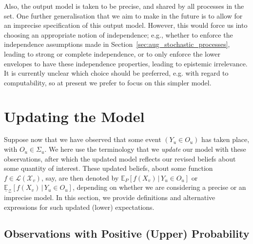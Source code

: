 \documentclass[twoside,11pt]{article}
\newcommand{\states}{\mathcal{X}}
\newcommand{\gambles}{\mathcal{L}}
\begin{document}
Also, the output model is taken to be precise, and shared by all processes in the set. One further generalisation that we aim to make in the future is to allow for an imprecise specification of this output model. However, this would force us into choosing an appropriate notion of independence; e.g., whether to enforce the independence assumptions made in Section~\ref{sec:aug_stochastic_processes}, leading to strong or complete independence, or to only enforce the lower envelopes to have these independence properties, leading to epistemic irrelevance. It is currently unclear which choice should be preferred, e.g. with regard to computability, so at present we prefer to focus on this simpler model.
\vspace{-8pt}

\section{Updating the Model}\label{sec:updating_model}


Suppose now that we have observed that some event $(Y_u\in O_u)$ has taken place, with $O_u\in\Sigma_u$. We here use the terminology that we \emph{update} our model with these observations, after which the updated model reflects our revised beliefs about some quantity of interest. These updated beliefs, about some function $f\in\gambles(\states_v)$, say, are then denoted by
$\mathbb{E}_P[f(X_v)\,\vert\,Y_u\in O_u]$
or $\underline{\mathbb{E}}_\mathcal{Z}[f(X_v)\,\vert\,Y_u\in O_u]$, 
depending on whether we are considering a precise or an imprecise model. In this section, we provide definitions and alternative expressions for such updated (lower) expectations.
\vspace{-8pt}

\subsection{Observations with Positive (Upper) Probability}\label{subsec:pos_prob}
\end{document}
